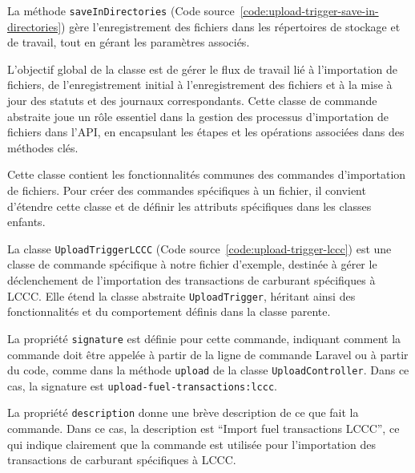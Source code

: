 
La méthode \Verb|saveInDirectories| (Code source~\ref{code:upload-trigger-save-in-directories}) gère l'enregistrement des fichiers dans les répertoires de stockage et de travail, tout en gérant les paramètres associés.


L'objectif global de la classe est de gérer le flux de travail lié à l'importation de fichiers, de l'enregistrement initial à l'enregistrement des fichiers et à la mise à jour des statuts et des journaux correspondants. Cette classe de commande abstraite joue un rôle essentiel dans la gestion des processus d'importation de fichiers dans l'API, en encapsulant les étapes et les opérations associées dans des méthodes clés.

Cette classe contient les fonctionnalités communes des commandes d'importation de fichiers. Pour créer des commandes spécifiques à un fichier, il convient d'étendre cette classe et de définir les attributs spécifiques dans les classes enfants.

La classe \Verb|UploadTriggerLCCC| (Code source~\ref{code:upload-trigger-lccc}) est une classe de commande spécifique à notre fichier d'exemple, destinée à gérer le déclenchement de l'importation des transactions de carburant spécifiques à LCCC. Elle étend la classe abstraite \Verb|UploadTrigger|, héritant ainsi des fonctionnalités et du comportement définis dans la classe parente.

La propriété \Verb|signature| est définie pour cette commande, indiquant comment la commande doit être appelée à partir de la ligne de commande Laravel ou à partir du code, comme dans la méthode \Verb|upload| de la classe \Verb|UploadController|. Dans ce cas, la signature est \Verb|upload-fuel-transactions:lccc|.

La propriété \Verb|description| donne une brève description de ce que fait la commande. Dans ce cas, la description est \foreignquote{french}{Import fuel transactions LCCC}, ce qui indique clairement que la commande est utilisée pour l'importation des transactions de carburant spécifiques à LCCC.

